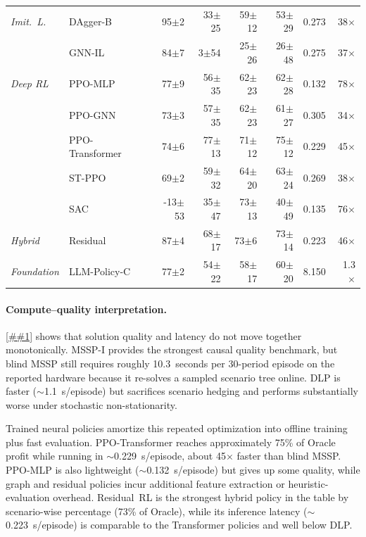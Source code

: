 \documentclass[10pt,a4paper]{article}
\providecommand{\multirow}[3]{#3}
\providecommand{\Cref}[1]{\ref{##1}}
\begin{document}
\begin{table}[!htbp]
\begin{tabular}{@{} l l rrrr rr @{}}
\midrule
\multirow{2}{*}{\textit{Imit.\ L.}}
  & DAgger-B         &  95$\pm$2  &  33$\pm$25 &  59$\pm$12 &  53$\pm$29 & 0.273 & 38$\times$ \\
  & GNN-IL           &  84$\pm$7  &  3$\pm$54  &  25$\pm$26 &  26$\pm$48 & 0.275 & 37$\times$ \\
\midrule
\multirow{5}{*}{\textit{Deep RL}}
  & PPO-MLP          &  77$\pm$9  &  56$\pm$35 &  62$\pm$23 &  62$\pm$28 & 0.132 & 78$\times$ \\
  & PPO-GNN          &  73$\pm$3  &  57$\pm$35 &  62$\pm$23 &  61$\pm$27 & 0.305 & 34$\times$ \\
  & PPO-Transformer  &  74$\pm$6  &  77$\pm$13 &  71$\pm$12 &  75$\pm$12 & 0.229 & 45$\times$ \\
  & ST-PPO           &  69$\pm$2  &  59$\pm$32 &  64$\pm$20 &  63$\pm$24 & 0.269 & 38$\times$ \\
  & SAC              &  -13$\pm$53 &  35$\pm$47 &  73$\pm$13 &  40$\pm$49 & 0.135 & 76$\times$ \\
\midrule
\textit{Hybrid} & Residual &  87$\pm$4  &  68$\pm$17 &  73$\pm$6  &  73$\pm$14 & 0.223 & 46$\times$ \\
\midrule
\textit{Foundation} & LLM-Policy-C &  77$\pm$2  &  54$\pm$22 &  58$\pm$17 &  60$\pm$20 & 8.150 & 1.3$\times$ \\
\bottomrule
\end{tabular}
\end{table}

\paragraph{Compute--quality interpretation.}

\Cref{tab:compute_quality} shows that solution quality and latency do
not move together monotonically. MSSP-I provides the strongest causal
quality benchmark, but blind MSSP still requires roughly
10.3~seconds per 30-period episode on the reported hardware because it
re-solves a sampled scenario tree online. DLP is faster
(${\sim}$1.1~s/episode) but sacrifices scenario hedging and performs
substantially worse under stochastic non-stationarity.

Trained neural policies amortize this repeated optimization into
offline training plus fast evaluation. PPO-Transformer reaches
approximately 75\% of Oracle profit while running in
${\sim}$0.229~s/episode, about 45$\times$ faster than blind MSSP.
PPO-MLP is also lightweight (${\sim}$0.132~s/episode) but gives up some
quality, while graph and residual policies incur additional feature
extraction or heuristic-evaluation overhead. Residual~RL is the
strongest hybrid policy in the table by scenario-wise percentage
(73\% of Oracle), while its inference latency
(${\sim}$0.223~s/episode) is comparable to the Transformer policies and
well below DLP.
\end{document}

